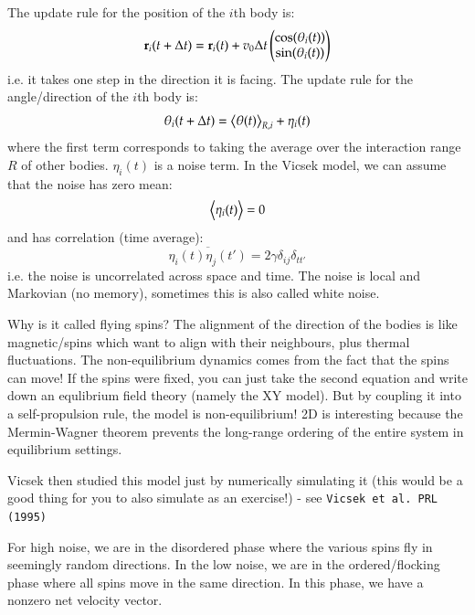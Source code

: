 The update rule for the position of the $i$th body is:
\begin{equation}
    \mathbf{r}_i(t + \Delta t) = \mathbf{r}_i(t) + v_0\Delta t\begin{pmatrix}\cos(\theta_i(t)) \\ \sin(\theta_i(t))\end{pmatrix}
\end{equation}
i.e. it takes one step in the direction it is facing. The update rule for the angle/direction of the $i$th body is:
\begin{equation}
    \theta_i(t + \Delta t) = \left< \theta(t) \right>_{R, i} + \eta_i(t)
\end{equation}
where the first term corresponds to taking the average over the interaction range $R$ of other bodies. $\eta_i(t)$ is a noise term. In the Vicsek model, we can assume that the noise has zero mean:
\begin{equation}
    \left< \eta_i(t) \right> = 0
\end{equation}
and has correlation (time average):
\begin{equation}
    \overline{\eta_i(t)\eta_j(t')} = 2\gamma\delta_{ij}\delta_{tt'}
\end{equation}
i.e. the noise is uncorrelated across space and time. The noise is local and Markovian (no memory), sometimes this is also called white noise.

Why is it called flying spins? The alignment of the direction of the bodies is like magnetic/spins which want to align with their neighbours, plus thermal fluctuations. The non-equilibrium dynamics comes from the fact that the spins can move! If the spins were fixed, you can just take the second equation and write down an equlibrium field theory (namely the XY model). But by coupling it into a self-propulsion rule, the model is non-equilibrium! 2D is interesting because the Mermin-Wagner theorem prevents the long-range ordering of the entire system in equilibrium settings.

Vicsek then studied this model just by numerically simulating it (this would be a good thing for you to also simulate as an exercise!) - see \texttt{Vicsek et al.\ PRL (1995)}

For high noise, we are in the disordered phase where the various spins fly in seemingly random directions. In the low noise, we are in the ordered/flocking phase where all spins move in the same direction. In this phase, we have a nonzero net velocity vector.


